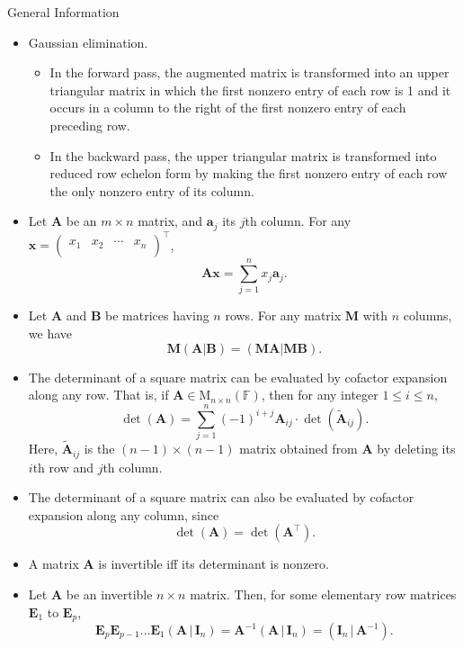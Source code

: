 \documentclass[../Notes.tex]{subfiles}
\begin{document}
\begin{stbox}{General Information}
\begin{itemize}
            \item Gaussian elimination. 
            \begin{itemize}
                \item In the forward pass, the augmented matrix is transformed into an upper triangular matrix in which the first nonzero entry of each row is 1 and it occurs in a column to the right of the first nonzero entry
                of each preceding row.
                \item  In the backward pass, the upper triangular matrix is transformed into reduced row echelon form by making the first nonzero entry of each row the only nonzero entry of its column.
            \end{itemize}
            \item Let \(\mathbf{A}\) be an \(m\times n\) matrix, and \(\mathbf{a}_j\) its \(j\)th column. For any \(\mathbf{x}=
            \begin{pmatrix}
                x_1 & x_2 & \cdots & x_n\\
            \end{pmatrix}^\top\), 
            \[\mathbf{A}\mathbf{x}=\sum_{j=1}^{n}{x_j}\mathbf{a}_j.\]
            \item Let \(\mathbf{A}\) and \(\mathbf{B}\) be matrices having \(n\) rows. For any matrix \(\mathbf{M}\) with \(n\) columns, we have
            \[\mathbf{M}(\mathbf{A}\vert \mathbf{B})=(\mathbf{MA}\vert \mathbf{MB}).\]
            \item The determinant of a square matrix can be evaluated by cofactor expansion along any row. That is, if \(\mathbf{A} \in \mathrm{M}_{n\times n}(\mathbb{F})\), then for any integer \(1\leq i\leq n\),
            \[\det(\mathbf{A})=\sum_{j=1}^{n}{(-1)}^{i+j}\mathbf{A}_{ij}\cdot \det(\widetilde{\mathbf{A}}_{ij}).\] 
            Here, \(\widetilde{\mathbf{A}}_{ij}\) is the \((n-1)\times(n-1)\) matrix obtained from \(\mathbf{A}\) by deleting its \(i\)th row and \(j\)th column.
            \item The determinant of a square matrix can also be evaluated by cofactor expansion along any column, since
            \[\det(\mathbf{A})=\det(\mathbf{A}^\top).\]
            \item A matrix \(\mathbf{A}\) is invertible iff its determinant is nonzero. 
            \item Let \(\mathbf{A}\) be an invertible \(n\times n\) matrix. Then, for some elementary row matrices \(\mathbf{E}_1\) to \(\mathbf{E}_p\),
            \[\mathbf{E}_p\mathbf{E}_{p-1}\dots \mathbf{E}_1(\mathbf{A} \,\vert\, \mathbf{I}_n)=\mathbf{A}^{-1}(\mathbf{A} \,\vert\, \mathbf{I}_n)=(\mathbf{I}_n \,\vert\, \mathbf{A}^{-1}).\]

\end{itemize}
\end{stbox}
\end{document}
